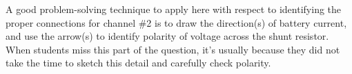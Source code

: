 A good problem-solving technique to apply here with respect to identifying the proper connections for channel \#2 is to draw the direction(s) of battery current, and use the arrow(s) to identify polarity of voltage across the shunt resistor.  When students miss this part of the question, it's usually because they did not take the time to sketch this detail and carefully check polarity.




